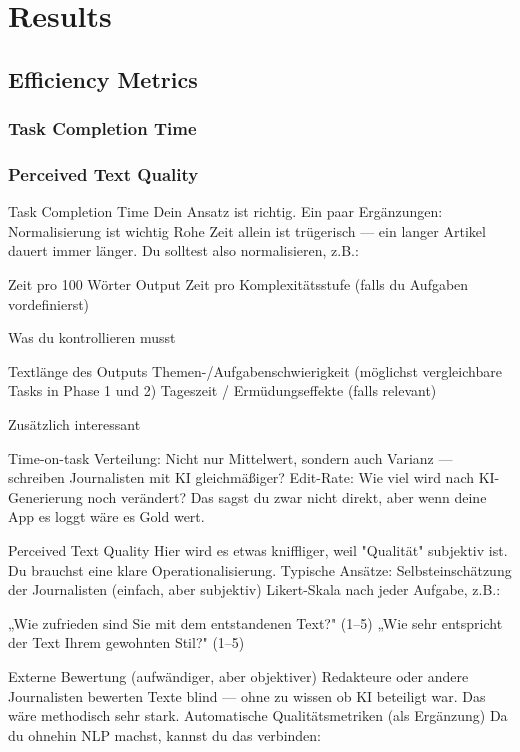 \chapter{Results}
\label{ch:results}


\section{Efficiency Metrics}

\subsection{Task Completion Time}
\subsection{Perceived Text Quality}
Task Completion Time
Dein Ansatz ist richtig. Ein paar Ergänzungen:
Normalisierung ist wichtig
Rohe Zeit allein ist trügerisch — ein langer Artikel dauert immer länger. Du solltest also normalisieren, z.B.:

Zeit pro 100 Wörter Output
Zeit pro Komplexitätsstufe (falls du Aufgaben vordefinierst)

Was du kontrollieren musst

Textlänge des Outputs
Themen-/Aufgabenschwierigkeit (möglichst vergleichbare Tasks in Phase 1 und 2)
Tageszeit / Ermüdungseffekte (falls relevant)

Zusätzlich interessant

Time-on-task Verteilung: Nicht nur Mittelwert, sondern auch Varianz — schreiben Journalisten mit KI gleichmäßiger?
Edit-Rate: Wie viel wird nach KI-Generierung noch verändert? Das sagst du zwar nicht direkt, aber wenn deine App es loggt wäre es Gold wert.


Perceived Text Quality
Hier wird es etwas kniffliger, weil "Qualität" subjektiv ist. Du brauchst eine klare Operationalisierung. Typische Ansätze:
Selbsteinschätzung der Journalisten (einfach, aber subjektiv)
Likert-Skala nach jeder Aufgabe, z.B.:

„Wie zufrieden sind Sie mit dem entstandenen Text?" (1–5)
„Wie sehr entspricht der Text Ihrem gewohnten Stil?" (1–5)

Externe Bewertung (aufwändiger, aber objektiver)
Redakteure oder andere Journalisten bewerten Texte blind — ohne zu wissen ob KI beteiligt war. Das wäre methodisch sehr stark.
Automatische Qualitätsmetriken (als Ergänzung)
Da du ohnehin NLP machst, kannst du das verbinden:

